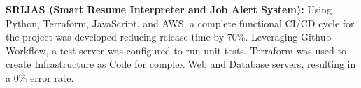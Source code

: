 \documentclass[letter,11pt]{article}
\makeatletter
\newcommand{\resumeItem}[2]{
  \vspace{-2pt}\item\small{
    \textbf{#1}{#2 \vspace{-2pt}}
  }
}
\newcommand{\resumeSubItem}[2]{
  \vspace{-2pt}\resumeItem{#1}{#2} \vspace{-2pt}}
\newcommand{\resumeSubProjheading}[3]{
	\vspace{-2pt}\item
	\begin{tabular*}{0.97\textwidth}[t]{l@{\extracolsep{\fill}}r}
		\textbf{#1} \\
		\textit{\small#2} & \textit{\small #3} \\
	\end{tabular*}\vspace{-2pt}
}
\newcommand{\resumeItemListStart}{\begin{itemize}[leftmargin=*]}
\newcommand{\resumeItemListEnd}{\end{itemize}}
\makeatother
\begin{document}
%    
%    
%    
%    
%    
%    
%    
    
    \resumeSubItem{SRIJAS (Smart Resume Interpreter and Job Alert System): }
    {Using Python, Terraform, JavaScript, and AWS, a complete functional CI/CD cycle for the project was developed reducing release time by 70\%. Leveraging Github Workflow, a test server was configured to run unit tests. Terraform was used to create Infrastructure as Code for complex Web and Database servers, resulting in a 0\% error rate. 
    }
    \vspace{4pt}
    
\end{document}
